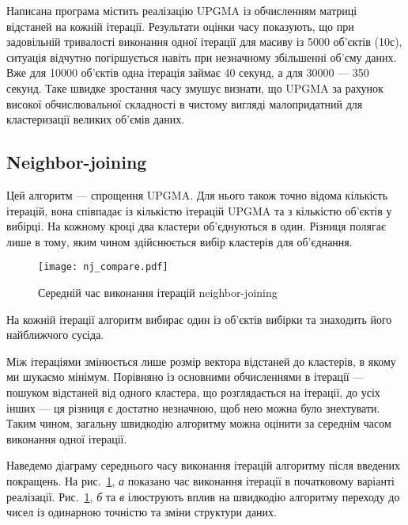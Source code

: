                 Написана програма містить реалізацію UPGMA із обчисленням матриці відстаней на кожній ітерації. Результати оцінки часу показують, що при задовільній тривалості виконання одної ітерації для масиву із 5000 об’єктів (10с), ситуація відчутно погіршується навіть при незначному збільшенні об’єму даних. Вже для 10000 об’єктів одна ітерація займає 40 секунд, а для 30000 --- 350 секунд. Таке швидке зростання часу змушує визнати, що UPGMA за рахунок високої обчислювальної складності в чистому вигляді малопридатний для кластеризації великих об’ємів даних.
                                
            \subsection{Neighbor-joining}
                Цей алгоритм --- спрощення UPGMA. Для нього також точно відома кількість ітерацій, вона співпадає із кількістю ітерацій UPGMA та з кількістю об’єктів у вибірці. На кожному кроці два кластери об’єднуються в один. Різниця полягає лише в тому, яким чином здійснюється вибір кластерів для об’єднання.
                
                \begin{figure}
                    \centering
                    \texttt{[image: nj\_compare.pdf]}
                    \caption{Середній час виконання ітерацій neighbor-joining}\label{fig:nj_compare}
                \end{figure}
                                
                На кожній ітерації алгоритм вибирає один із об’єктів вибірки та знаходить його найближчого сусіда. 
                
                Між ітераціями змінюється лише розмір вектора відстаней до кластерів, в якому ми шукаємо мінімум. Порівняно із основними обчисленнями в ітерації --- пошуком відстаней від одного кластера, що розглядається на ітерації, до усіх інших --- ця різниця є достатно незначною, щоб нею можна було знехтувати. Таким чином, загальну швидкодію алгоритму можна оцінити за середнім часом виконання одної ітерації.

               
                Наведемо діаграму середнього часу виконання ітерацій алгоритму після введених покращень. На рис.~\ref{fig:nj_compare}, \emph{а} показано час виконання ітерації в початковому варіанті реалізації. Рис.~\ref{fig:nj_compare}, \emph{б} та \emph{в} ілюструють вплив на швидкодію алгоритму переходу до чисел із одинарною точністю та зміни структури даних. 
                
